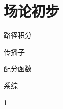 \ifx\allfiles\undefined



	\else
	\fi
\chapter{场论初步}
\begin{introduction}
	\item 路径积分
	\item 传播子
	\item 配分函数
	\item 系综
\end{introduction}
1

	
	
	
	
	
\ifx\allfiles\undefined

	\else
	\fi

